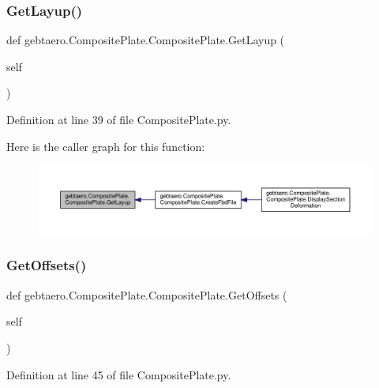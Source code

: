 \subsubsection{\texorpdfstring{Get\+Layup()}{GetLayup()}}
{\footnotesize\ttfamily def gebtaero.\+Composite\+Plate.\+Composite\+Plate.\+Get\+Layup (\begin{DoxyParamCaption}\item[{}]{self }\end{DoxyParamCaption})}



Definition at line 39 of file Composite\+Plate.\+py.

Here is the caller graph for this function\+:
\nopagebreak
\begin{figure}[H]
\begin{center}
\leavevmode
\includegraphics[width=350pt]{classgebtaero_1_1_composite_plate_1_1_composite_plate_a37b3c4c3dc5cd919ccfc06828448911b_icgraph}
\end{center}
\end{figure}
\mbox{\label{classgebtaero_1_1_composite_plate_1_1_composite_plate_a179bd2f7f860afe99ab99e928fa12d11}} 
\subsubsection{\texorpdfstring{Get\+Offsets()}{GetOffsets()}}
{\footnotesize\ttfamily def gebtaero.\+Composite\+Plate.\+Composite\+Plate.\+Get\+Offsets (\begin{DoxyParamCaption}\item[{}]{self }\end{DoxyParamCaption})}



Definition at line 45 of file Composite\+Plate.\+py.

\mbox{\label{classgebtaero_1_1_composite_plate_1_1_composite_plate_a093864b1001bc131f474adbd543390c6}} 

